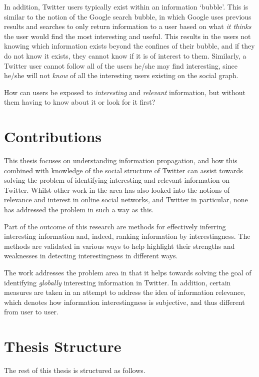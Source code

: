 In addition, Twitter users typically exist within an information `bubble'. This is similar to the notion of the Google search bubble, in which Google uses previous results and searches to only return information to a user based on what \textit{it thinks} the user would find the most interesting and useful. This results in the users not knowing which information exists beyond the confines of their bubble, and if they do not know it exists, they cannot know if it is of interest to them. Similarly, a Twitter user cannot follow all of the users he/she may find interesting, since he/she will not \textit{know} of all the interesting users existing on the social graph.

How can users be exposed to \textit{interesting} and \textit{relevant} information, but without them having to know about it or look for it first?


\section{Contributions}
This thesis focuses on understanding information propagation, and how this combined with knowledge of the social structure of Twitter can assist towards solving the problem of identifying interesting and relevant information on Twitter. 
Whilst other work in the area has also looked into the notions of relevance and interest in online social networks, and Twitter in particular, none has addressed the problem in such a way as this.

Part of the outcome of this research are methods for effectively inferring interesting information and, indeed, ranking information by interestingness. The methods are validated in various ways to help highlight their strengths and weaknesses in detecting interestingness in different ways.

The work addresses the problem area in that it helps towards solving the goal of identifying \textit{globally} interesting information in Twitter. In addition, certain measures are taken in an attempt to address the idea of information relevance, which denotes how information interestingness is subjective, and thus different from user to user.


\section{Thesis Structure}
The rest of this thesis is structured as follows.

